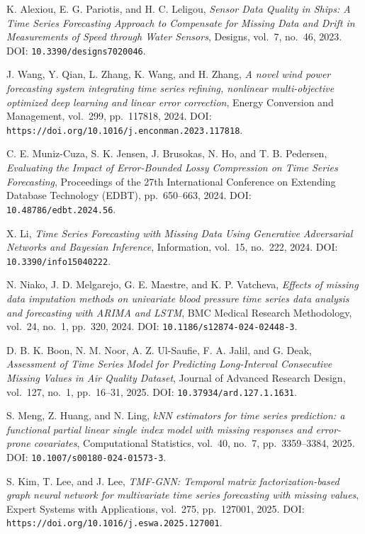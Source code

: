 \begin{enumerate}[label={[S\arabic*]}]
    K. Alexiou, E. G. Pariotis, and H. C. Leligou, \textit{Sensor Data Quality in Ships: A Time Series Forecasting Approach to Compensate for Missing Data and Drift in Measurements of Speed through Water Sensors}, Designs, vol.~7, no.~46, 2023. DOI: \texttt{10.3390/designs7020046}.
    \item %
    J. Wang, Y. Qian, L. Zhang, K. Wang, and H. Zhang, \textit{A novel wind power forecasting system integrating time series refining, nonlinear multi-objective optimized deep learning and linear error correction}, Energy Conversion and Management, vol.~299, pp.~117818, 2024. DOI: \texttt{https://doi.org/10.1016/j.enconman.2023.117818}.
    \item %
    C. E. Muniz-Cuza, S. K. Jensen, J. Brusokas, N. Ho, and T. B. Pedersen, \textit{Evaluating the Impact of Error-Bounded Lossy Compression on Time Series Forecasting}, Proceedings of the 27th International Conference on Extending Database Technology (EDBT), pp.~650–663, 2024. DOI: \texttt{10.48786/edbt.2024.56}.
    \item %
    X. Li, \textit{Time Series Forecasting with Missing Data Using Generative Adversarial Networks and Bayesian Inference}, Information, vol.~15, no.~222, 2024. DOI: \texttt{10.3390/info15040222}.
    \item %
    N. Niako, J. D. Melgarejo, G. E. Maestre, and K. P. Vatcheva, \textit{Effects of missing data imputation methods on univariate blood pressure time series data analysis and forecasting with ARIMA and LSTM}, BMC Medical Research Methodology, vol.~24, no.~1, pp.~320, 2024. DOI: \texttt{10.1186/s12874-024-02448-3}.
    \item %
    D. B. K. Boon, N. M. Noor, A. Z. Ul-Saufie, F. A. Jalil, and G. Deak, \textit{Assessment of Time Series Model for Predicting Long-Interval Consecutive Missing Values in Air Quality Dataset}, Journal of Advanced Research Design, vol.~127, no.~1, pp.~16–31, 2025. DOI: \texttt{10.37934/ard.127.1.1631}.
    \item %
    S. Meng, Z. Huang, and N. Ling, \textit{kNN estimators for time series prediction: a functional partial linear single index model with missing responses and error-prone covariates}, Computational Statistics, vol.~40, no.~7, pp.~3359–3384, 2025. DOI: \texttt{10.1007/s00180-024-01573-3}.
    \item %
    S. Kim, T. Lee, and J. Lee, \textit{TMF-GNN: Temporal matrix factorization-based graph neural network for multivariate time series forecasting with missing values}, Expert Systems with Applications, vol.~275, pp.~127001, 2025. DOI: \texttt{https://doi.org/10.1016/j.eswa.2025.127001}.

\end{enumerate}
